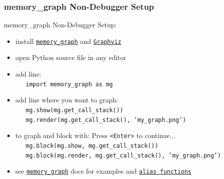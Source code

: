 \documentclass[10pt, colorlinks=true, urlcolor=blue]{beamer}
\begin{document}
\begin{frame}[fragile]\frametitle{memory\_graph Non-Debugger Setup}
  memory\_graph Non-Debugger Setup:
  \begin{itemize}
  \item install \href{https://pypi.org/project/memory-graph/}{\texttt{memory\_graph}} and \href{https://graphviz.org/download/}{\texttt{Graphviz}}
  \item open Python source file in any editor
  \item add line: \\ \ \ \ {\footnotesize \texttt{import memory_graph as mg}}
  \item add line where you want to graph: \\
    \ \ \ {\footnotesize \texttt{mg.show(mg.get_call_stack())}}\\
    \ \ \ {\footnotesize \texttt{mg.render(mg.get_call_stack(), 'my_graph.png')}}\\
  \item to graph and block with: Press \texttt{<Enter>} to continue...\\
    \ \ \ {\footnotesize \texttt{mg.block(mg.show, mg.get_call_stack())}}\\
    \ \ \ {\footnotesize \texttt{mg.block(mg.render, mg.get_call_stack(), 'my_graph.png')}}\\
  \item see \href{https://pypi.org/project/memory-graph/}{\texttt{memory\_graph}} docs for examples and \href{https://github.com/bterwijn/memory_graph?tab=readme-ov-file#debugging-without-debugger-tool}{\texttt{alias functions}}
  \end{itemize}
\end{frame}
\end{document}
